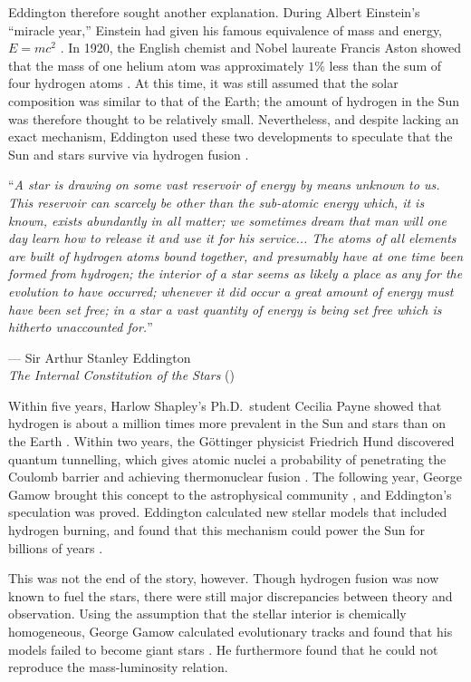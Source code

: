 Eddington therefore sought another explanation. 
During Albert Einstein's ``miracle year,'' Einstein had given his famous equivalence of mass and energy, ${E=mc^2}$ \citep{1905AnP...323..639E}. 
In 1920, the English chemist and Nobel laureate Francis Aston showed that the mass of one helium atom was approximately $1\%$ less than the sum of four hydrogen atoms \citep{aston1920lix}. 
At this time, it was still assumed that the solar composition was similar to that of the Earth; the amount of hydrogen in the Sun was therefore thought to be relatively small. 
Nevertheless, and despite lacking an exact mechanism, Eddington used these two developments to speculate that the Sun and stars survive via hydrogen fusion \citep{1920SciMo..11..297E}. 
\epigraph{``\emph{A star is drawing on some vast reservoir of energy by means unknown to us. \hphantom{``}This reservoir can scarcely be other than the sub-atomic energy which, it is \hphantom{``}known, exists abundantly in all matter; we sometimes dream that man will one \hphantom{``}day learn how to release it and use it for his service... The atoms of all elements \hphantom{``}are built of hydrogen atoms bound together, and presumably have at one time \hphantom{``}been formed from hydrogen; the interior of a star seems as likely a place as any for \hphantom{``}the evolution to have occurred; whenever it did occur a great amount of energy \hphantom{``}must have been set free; in a star a vast quantity of energy is being set free which \hphantom{``}is hitherto unaccounted for.}''}{--- Sir Arthur Stanley Eddington \\\emph{The Internal Constitution of the Stars} (\citeyear{1920SciMo..11..297E})} 

Within five years, Harlow Shapley's Ph.D.\ student Cecilia Payne showed that hydrogen is about a million times more prevalent in the Sun and stars than on the Earth \citep{1925PhDT.........1P}.
Within two years, the G\"ottinger physicist Friedrich Hund discovered quantum tunnelling, which gives atomic nuclei a probability of penetrating the Coulomb barrier and achieving thermonuclear fusion \citep{hund1927deutung,Nimtz2009}. 
The following year, George Gamow brought this concept to the astrophysical community \citep{1928Natur.122..805G}, and Eddington's speculation was proved. 
Eddington calculated new stellar models that included hydrogen burning, and found that this mechanism could power the Sun for billions of years \citep{1926ics..book.....E}. 

This was not the end of the story, however. 
Though hydrogen fusion was now known to fuel the stars, there were still major discrepancies between theory and observation. 
Using the assumption that the stellar interior is chemically homogeneous, George Gamow calculated evolutionary tracks and found that his models failed to become giant stars \citep[][see also Figure~\ref{fig:gamow-tracks}]{1938PhRv...53..907G}.
He furthermore found that he could not reproduce the mass-luminosity relation. 

